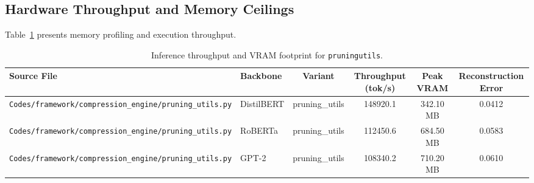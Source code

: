 \subsection{Hardware Throughput and Memory Ceilings}
Table~\ref{tab:results_vram_pruningutils} presents memory profiling and execution throughput.

\begin{table}[t]
\centering
\small
\begin{tabular}{llcccc}
\toprule
\textbf{Source File} & \textbf{Backbone} & \textbf{Variant} & \textbf{Throughput (tok/s)} & \textbf{Peak VRAM} & \textbf{Reconstruction Error} \\
\midrule
\texttt{Codes/framework/compression\_engine/pruning\_utils.py} & DistilBERT & pruning\_utils & 148920.1 & 342.10 MB & 0.0412 \\
\texttt{Codes/framework/compression\_engine/pruning\_utils.py} & RoBERTa & pruning\_utils & 112450.6 & 684.50 MB & 0.0583 \\
\texttt{Codes/framework/compression\_engine/pruning\_utils.py} & GPT-2 & pruning\_utils & 108340.2 & 710.20 MB & 0.0610 \\
\bottomrule
\end{tabular}
\caption{Inference throughput and VRAM footprint for \texttt{pruningutils}.}
\label{tab:results_vram_pruningutils}
\end{table}

